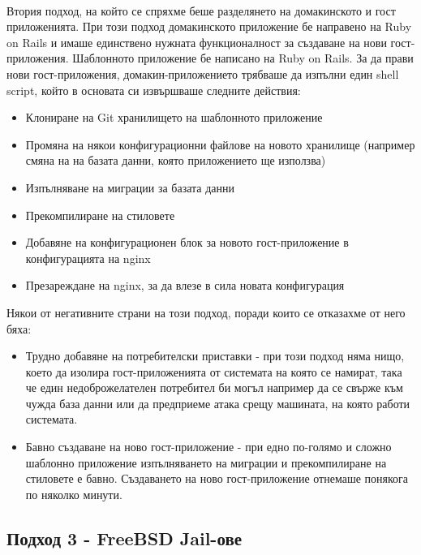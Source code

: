 \documentclass[pdftex,14pt,a4paper]{extreport}
\begin{document}
\paragraph {}
Втория подход, на който се спряхме беше разделянето на домакинското и гост приложенията. При този подход домакинското приложение бе направено на Ruby on Rails и имаше единствено нужната функционалност за създаване на нови гост-приложения. Шаблонното приложение бе написано на Ruby on Rails. За да прави нови гост-приложения, домакин-приложението трябваше да изпълни един shell script, който в основата си извършваше следните действия:
\begin{itemize}
  \item Клониране на Git хранилището на шаблонното приложение
  \item Промяна на някои конфигурационни файлове на новото хранилище (например смяна на на базата данни, която приложението ще използва)
  \item Изпълняване на миграции за базата данни
  \item Прекомпилиране на стиловете
  \item Добавяне на конфигурационен блок за новото гост-приложение в конфигурацията на nginx
  \item Презареждане на nginx, за да влезе в сила новата конфигурация
\end{itemize}
Някои от негативните страни на този подход, поради които се отказахме от него бяха:
\begin{itemize}
  \item Трудно добавяне на потребителски приставки - при този подход няма нищо, което да изолира гост-приложенията от системата на която се намират, така че един недоброжелателен потребител би могъл например да се свърже към чужда база данни или да предприеме атака срещу машината, на която работи системата.
  \item Бавно създаване на ново гост-приложение - при едно по-голямо и сложно шаблонно приложение изпълняването на миграции и прекомпилиране на стиловете е бавно. Създаването на ново гост-приложение отнемаше понякога по няколко минути.
\end{itemize}
\subsection {Подход 3 - FreeBSD Jail-ове}
\end{document}
